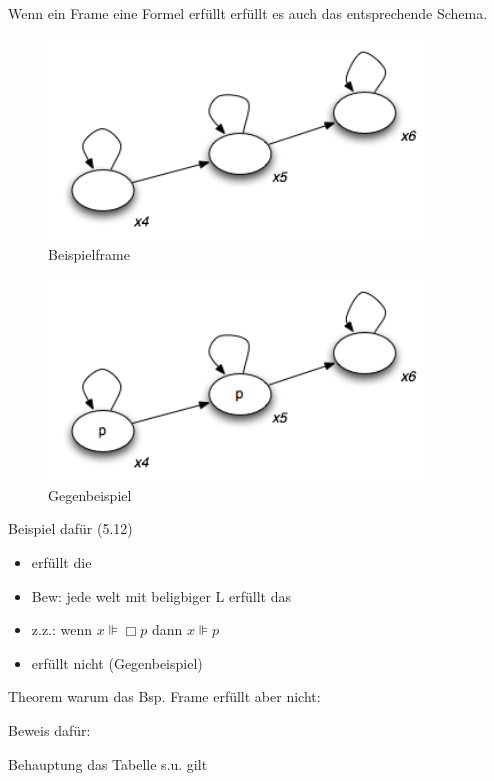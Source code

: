 Wenn ein Frame eine Formel erfüllt erfüllt es auch das entsprechende Schema.

\begin{figure}[h!]
	\label{fig:Kripke02}
	\centering
	\includegraphics[width=10cm]{Images/Kripke02}
	\caption{Beispielframe}
\end{figure}

\begin{figure}[h!]
	\label{fig:Kripke03}
	\centering
	\includegraphics[width=10cm]{Images/Kripke03}
	\caption{Gegenbeispiel}
\end{figure}


Beispiel dafür (5.12)
\begin{itemize}
	\item erfüllt die \TFormel
	\item Bew: jede welt mit beligbiger L erfüllt das
	\item z.z.: wenn $x \VDash \Box p$ dann $x \VDash p$
	\item erfüllt nicht \vierFormel (Gegenbeispiel)
\end{itemize}


Theorem warum das Bsp. Frame \TFormel erfüllt aber \vierFormel nicht:

Beweis dafür:

Behauptung das Tabelle s.u. gilt












